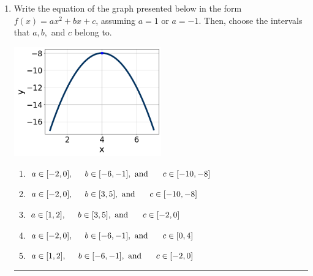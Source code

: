 \documentclass[14pt]{extbook}
\newcommand{\litem}[1]{\item#1\hspace*{-1cm}\rule{\textwidth}{0.4pt}}
\begin{document}
\begin{enumerate}
{\begin{enumerate}[label=\Alph*.]
\end{enumerate} }
\litem{
Write the equation of the graph presented below in the form $f(x)=ax^2+bx+c$, assuming  $a=1$ or $a=-1$. Then, choose the intervals that $a, b,$ and $c$ belong to.
\begin{center}
    \includegraphics[width=0.5\textwidth]{../Figures/quadraticGraphToEquationB.png}
\end{center}
\begin{enumerate}[label=\Alph*.]
\item \( a \in [-2, 0], \hspace*{5mm} b \in [-6, -1], \text{ and } \hspace*{5mm} c \in [-10, -8] \)
\item \( a \in [-2, 0], \hspace*{5mm} b \in [3, 5], \text{ and } \hspace*{5mm} c \in [-10, -8] \)
\item \( a \in [1, 2], \hspace*{5mm} b \in [3, 5], \text{ and } \hspace*{5mm} c \in [-2, 0] \)
\item \( a \in [-2, 0], \hspace*{5mm} b \in [-6, -1], \text{ and } \hspace*{5mm} c \in [0, 4] \)
\item \( a \in [1, 2], \hspace*{5mm} b \in [-6, -1], \text{ and } \hspace*{5mm} c \in [-2, 0] \)


\end{enumerate}}
\end{enumerate}
\end{document}
